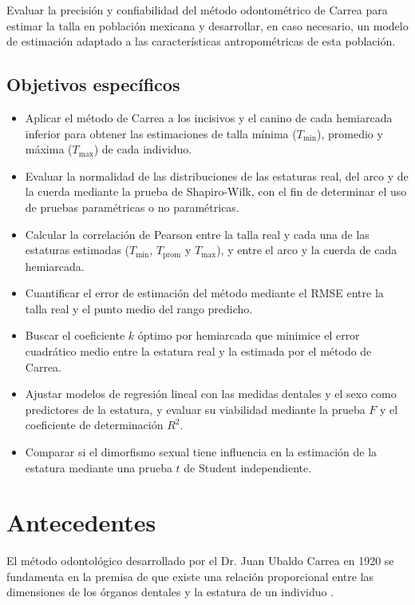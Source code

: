 \documentclass[11pt,letterpaper]{article}
\begin{document}
Evaluar la precisión y confiabilidad del método odontométrico de Carrea para estimar la talla en población mexicana y desarrollar, en caso necesario, un modelo de estimación adaptado a las características antropométricas de esta población.

\subsection*{Objetivos específicos}
\begin{itemize}
    \item Aplicar el método de Carrea a los incisivos y el canino de cada
    hemiarcada inferior para obtener las estimaciones de talla mínima
    ($T_{\min}$), promedio y máxima ($T_{\max}$) de cada individuo.

    \item Evaluar la normalidad de las distribuciones de las estaturas real,
    del arco y de la cuerda mediante la prueba de Shapiro-Wilk, con el fin de
    determinar el uso de pruebas paramétricas o no paramétricas.

    \item Calcular la correlación de Pearson entre la talla real y cada una
    de las estaturas estimadas ($T_{\min}$, $T_{\text{prom}}$ y $T_{\max}$),
    y entre el arco y la cuerda de cada hemiarcada.

    \item Cuantificar el error de estimación del método mediante el RMSE entre
    la talla real y el punto medio del rango predicho.

    \item Buscar el coeficiente $k$ óptimo por hemiarcada que minimice el error
    cuadrático medio entre la estatura real y la estimada por el método de Carrea.

    \item Ajustar modelos de regresión lineal con las medidas dentales y el sexo
    como predictores de la estatura, y evaluar su viabilidad mediante la prueba $F$
    y el coeficiente de determinación $R^2$.

    \item Comparar si el dimorfismo sexual tiene influencia en la estimación
    de la estatura mediante una prueba $t$ de Student independiente.
\end{itemize}


\section*{Antecedentes}
El método odontológico desarrollado por el Dr. Juan Ubaldo Carrea en 1920 se fundamenta en la premisa de que existe una relación proporcional entre las dimensiones de los órganos dentales y la estatura de un individuo \cite{Brito2022}.
\end{document}
